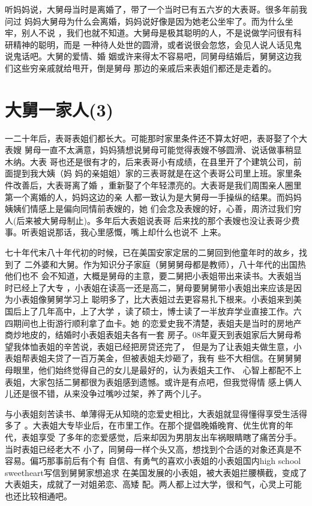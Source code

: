 \documentclass[12pt]{book}
\begin{document}
听妈妈说，大舅母当时是离婚了，带了一个当时已有五六岁的大表哥。很多年前我问过
妈妈大舅母为什么会离婚，妈妈说好像是因为她老公坐牢了。而为什么坐牢，别人不说
，我们也就不知道。大舅母是极其聪明的人，不是说做学问很有科研精神的聪明，而是
一种待人处世的圆滑，或者说很会忽悠，会见人说人话见鬼说鬼话吧。大舅的爱情、婚
姻或许来得太不容易吧，同舅母结婚后，舅舅这边我们这些穷亲戚就给甩开，倒是舅母
那边的亲戚后来表姐们都还是走着的。
\section{大舅一家人(3)}
\label{sec-9-30}

一二十年后，表哥表姐们都长大。可能那时家里条件还不算太好吧，表哥娶了个大表嫂
舅母一直不太满意，妈妈猜想说舅母可能觉得表嫂不够圆滑、说话做事稍显木纳。大表
哥也还是很有才的，后来表哥小有成绩，在县里开了个建筑公司，前面提到我大姨（妈
妈的亲姐姐）家的三表哥就是在这个表哥公司里上班。家里条件改善后，大表哥离了婚
，重新娶了个年轻漂亮的。大表哥是我们周围亲人圈里第一个离婚的人，妈妈这边的亲
人都一致认为是大舅母一手操纵的结果。而妈妈姨姨们情感上是偏向同情前表嫂的，她
们会念及表嫂的好，心善，周济过我们穷人(后来被大舅母制止)。多年后大表姐说表哥
后来找的那个表嫂也没让表哥少费事。听表姐说那话，我心里感慨，嘴上却什么也说不
上来。

七十年代末八十年代初的时候，已在美国安家定居的二舅回到他童年时的故乡，找到了
二外婆和大舅。作为知识分子家庭（舅舅舅母都是教师），八十年代的出国热他们也不
会不知道，大概是舅母的主意，要二舅把小表姐带出来读书。大表姐当时已经上了大专
，小表姐在读高一还是高二，舅母要舅舅带小表姐出来应该是因为小表姐像舅舅学习上
聪明多了，比大表姐过去更容易扎下根来。小表姐来到美国后上了几年高中，上了大学
，读了硕士，博士读了一半放弃学业直接工作。六四期间也上街游行顺利拿了血卡。她
的恋爱史我不清楚，表姐夫是当时的房地产商炒地皮的，结婚时小表姐表姐夫各有一套
房子。08年夏天到表姐家后大舅母希望我体恤表姐的辛苦说，表姐已经把房贷还完了，
但是为了让表姐夫做生意，小表姐帮表姐夫贷了一百万美金，但被表姐夫炒砸了，我有
些不大相信。在舅舅舅母眼里，他们始终觉得自己的女儿是最好的，认为表姐夫工作、
心智上都配不上表姐，大家包括二舅都很为表姐感到遗憾。或许是有点吧，但我觉得情
感上俩人儿还是很不错，从来没争过嘴吵过架，养了两个儿子。

与小表姐刻苦读书、单薄得无从知晓的恋爱史相比，大表姐就显得懂得享受生活得多了
。大表姐大专毕业后，在市里工作。在那个提倡晚婚晚育、优生优育的年代，表姐享受
了多年的恋爱感觉，后来却因为男朋友出车祸眼睛瞎了痛苦分手。当时表姐已经老大不
小了，同舅母一样个头又高，想找到个合适的对象还真是不容易。偏巧那事前后有个有
自信、有勇气的喜欢小表姐的小表姐国内high school sweetheart写信到舅舅家想追求
在美国发展的小表姐，被大表姐拦腰横截，变成了大表姐夫，成就了一对姐弟恋、高矮
配。两人都上过大学，很和气，心灵上可能也还比较相通吧。
\end{document}
